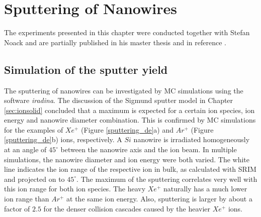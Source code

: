 \chapter{Sputtering of Nanowires}
\label{sec:sputter}

The experiments presented in this chapter were conducted together with Stefan Noack and are partially published in his master thesis \cite{noack_sputter_2014} and in reference \cite{johannes_anomalous_2015}.




\section{Simulation of the sputter yield}
\label{sec:simsputering}

The sputtering of nanowires can be investigated by MC simulations using the software \emph{iradina}. The discussion of the Sigmund sputter model in Chapter \ref{sec:ionsolid} concluded that a maximum is expected for a certain ion species, ion energy and nanowire diameter combination. This is confirmed by MC simulations for the examples of $Xe^+$ (Figure \ref{sputtering_de}a) and $Ar^+$ (Figure \ref{sputtering_de}b) ions, respectively. A $Si$ nanowire is irradiated homogeneously at an angle of $45^\circ$ between the nanowire axis and the ion beam. In multiple simulations, the nanowire diameter and ion energy were both varied. The white line indicates the ion range of the respective ion in bulk, as calculated with SRIM and projected on to $45^\circ$. The maximum of the sputtering correlates very well with this ion range for both ion species. The heavy $Xe^+$ naturally has a much lower ion range than $Ar^+$ at the same ion energy. Also, sputtering is larger by about a factor of $2.5$ for the denser collision cascades caused by the heavier $Xe^+$ ions.

